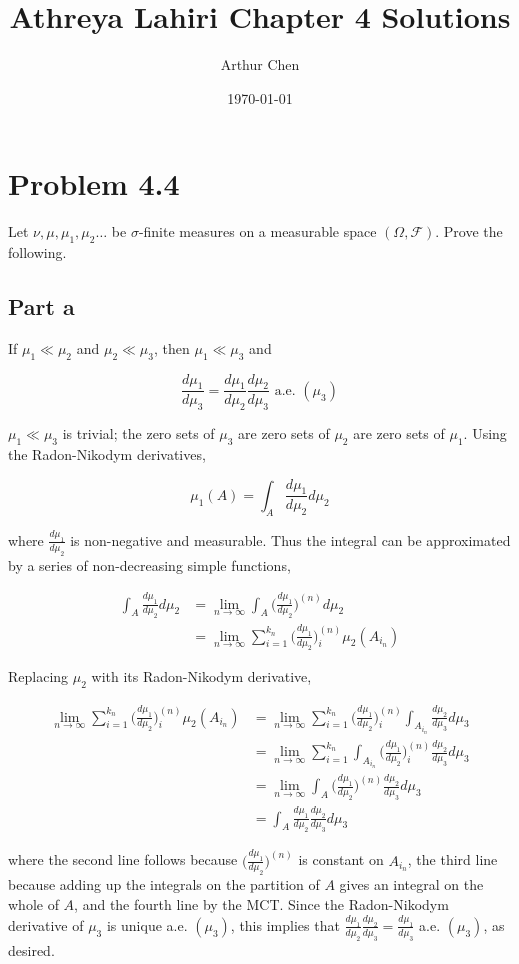 \documentclass{article}
\author{Arthur Chen}
\title{Athreya Lahiri Chapter 4 Solutions}
\date{\today}
\newcommand{\F}{\mathcal{F}}
\begin{document}
\maketitle

\section*{Problem 4.4}

Let $\nu, \mu, \mu_1, \mu_2 \hdots$ be $\sigma$-finite measures on a measurable space $(\Omega, \F)$. Prove the following.

\subsection*{Part a}

If $\mu_1 \ll \mu_2$ and $\mu_2 \ll \mu_3$, then $\mu_1 \ll \mu_3$ and

\[
\frac{d\mu_1}{d\mu_3} = \frac{d\mu_1}{d\mu_2}\frac{d\mu_2}{d\mu_3} \text{ a.e. } (\mu_3)
\]

$\mu_1 \ll \mu_3$ is trivial; the zero sets of $\mu_3$ are zero sets of $\mu_2$ are zero sets of $\mu_1$. Using the Radon-Nikodym derivatives,

\[
\mu_1(A) = \int_A \frac{d\mu_1}{d\mu_2} d\mu_2
\]

where $\frac{d\mu_1}{d\mu_2}$ is non-negative and measurable. Thus the integral can be approximated by a series of non-decreasing simple functions,

\begin{align*}
\int_A \frac{d\mu_1}{d\mu_2} d\mu_2 &= \lim_{n\rightarrow \infty} \int_A \biggl( \frac{d\mu_1}{d\mu_2} \biggr)^{(n)}d\mu_2 \\
&= \lim_{n\rightarrow \infty} \sum_{i=1}^{k_n} \biggl( \frac{d\mu_1}{d\mu_2}\biggr)^{(n)}_i \mu_2(A_{i_n})
\end{align*}

Replacing $\mu_2$ with its Radon-Nikodym derivative,

\begin{align*}
\lim_{n\rightarrow \infty} \sum_{i=1}^{k_n} \biggl( \frac{d\mu_1}{d\mu_2}\biggr)^{(n)}_i \mu_2(A_{i_n}) &= 
\lim_{n\rightarrow \infty} \sum_{i=1}^{k_n} \biggl( \frac{d\mu_1}{d\mu_2}\biggr)^{(n)}_i \int_{A_{i_n}} \frac{d\mu_2}{d\mu_3} d\mu_3 \\
&= \lim_{n\rightarrow \infty} \sum_{i=1}^{k_n} \int_{A_{i_n}} \biggl( \frac{d\mu_1}{d\mu_2}\biggr)^{(n)}_i \frac{d\mu_2}{d\mu_3} d\mu_3 \\
&= \lim_{n\rightarrow \infty} \int_A \biggl( \frac{d\mu_1}{d\mu_2}\biggr)^{(n)} \frac{d\mu_2}{d\mu_3} d\mu_3 \\
&= \int_A \frac{d\mu_1}{d\mu_2} \frac{d\mu_2}{d\mu_3} d\mu_3
\end{align*}

where the second line follows because $\biggl( \frac{d\mu_1}{d\mu_2}\biggr)^{(n)}$ is constant on $A_{i_n}$, the third line because adding up the integrals on the partition of $A$ gives an integral on the whole of $A$, and the fourth line by the MCT. Since the Radon-Nikodym derivative of $\mu_3$ is unique a.e. $(\mu_3)$, this implies that $\frac{d\mu_1}{d\mu_2} \frac{d\mu_2}{d\mu_3} = \frac{d\mu_1}{d\mu_3}$ a.e. $(\mu_3)$, as desired.
\end{document}
